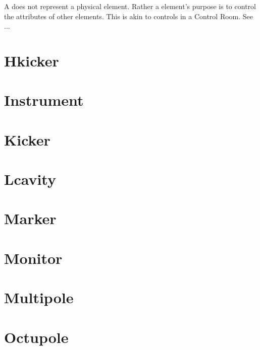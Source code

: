 A  does not represent a physical element. Rather a
 element's purpose is to control the attributes of other elements.
This is akin to controls in a Control Room. See ...

\section{Hkicker}
\label{s:hk}

\section{Instrument}
\label{s:inst}

\section{Kicker}
\label{s:k}

\section{Lcavity}
\label{s:lcav}

\section{Marker}
\label{s:mark}

\section{Monitor}
\label{s:mon}

\section{Multipole}
\label{s:m}

\section{Octupole}
\label{s:oct}

